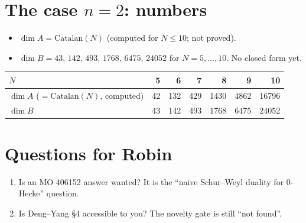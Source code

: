 \documentclass[11pt]{amsart}
\newcommand{\gr}[1]{\textsf{#1}}
\theoremstyle{plain}
\theoremstyle{definition}
\begin{document}
\section{The case $n=2$: numbers}
\begin{itemize}[leftmargin=1.2em,itemsep=2pt]
\item $\dim A=\mathrm{Catalan}(N)$ (\gr{computed} for $N\le10$; not proved).
\item $\dim B=43,\,142,\,493,\,1768,\,6475,\,24052$ for $N=5,\dots,10$. No closed form yet.
\end{itemize}
\begin{center}
\begin{tabular}{lrrrrrr}
\toprule
$N$ & 5 & 6 & 7 & 8 & 9 & 10\\
\midrule
$\dim A$ ($=\mathrm{Catalan}(N)$, computed) & 42 & 132 & 429 & 1430 & 4862 & 16796\\
$\dim B$ & 43 & 142 & 493 & 1768 & 6475 & 24052\\
\bottomrule
\end{tabular}
\end{center}

\section{Questions for Robin}
\begin{enumerate}[leftmargin=1.5em,itemsep=2pt]
\item Is an MO 406152 answer wanted? It is the ``naive Schur--Weyl duality for $0$-Hecke'' question.
\item Is Deng--Yang \S4 accessible to you? The novelty gate is still ``not found''.
\end{enumerate}
\end{document}
